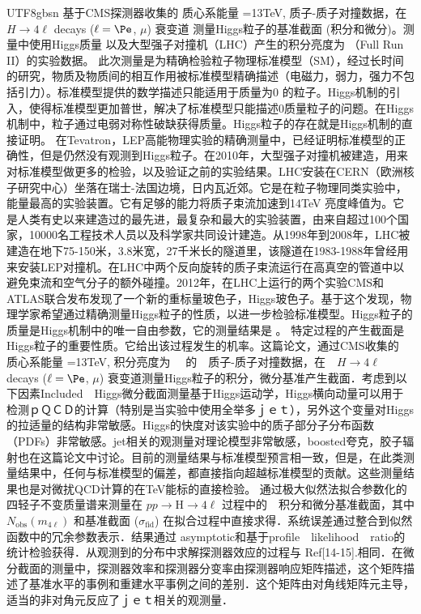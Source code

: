 \begin{CJK}{UTF8}{gbsn}
基于CMS探测器收集的 质心系能量 =13TeV, 质子-质子对撞数据，在$ H \to 4\ell$ decays ($\ell = \Pe$, $\mu$) 衰变道 测量Higgs粒子的基准截面 (积分和微分)。测量中使用Higgs质量 以及大型强子对撞机（LHC）产生的积分亮度为 （Full Run II）的实验数据。
此次测量是为精确检验粒子物理标准模型（SM），经过长时间的研究，物质及物质间的相互作用被标准模型精确描述（电磁力，弱力，强力不包括引力）。标准模型提供的数学描述只能适用于质量为0 的粒子。Higgs机制的引入，使得标准模型更加普世，解决了标准模型只能描述0质量粒子的问题。在Higgs机制中，粒子通过电弱对称性破缺获得质量。Higgs粒子的存在就是Higgs机制的直接证明。
在Tevatron，LEP高能物理实验的精确测量中，已经证明标准模型的正确性，但是仍然没有观测到Higgs粒子。在2010年，大型强子对撞机被建造，用来对标准模型做更多的检验，以及验证之前的实验结果。LHC安装在CERN（欧洲核子研究中心）坐落在瑞士-法国边境，日内瓦近郊。它是在粒子物理同类实验中，能量最高的实验装置。它有足够的能力将质子束流加速到14TeV 亮度峰值为。它是人类有史以来建造过的最先进，最复杂和最大的实验装置，由来自超过100个国家，10000名工程技术人员以及科学家共同设计建造。从1998年到2008年，LHC被建造在地下75-150米，3.8米宽，27千米长的隧道里，该隧道在1983-1988年曾经用来安装LEP对撞机。在LHC中两个反向旋转的质子束流运行在高真空的管道中以避免束流和空气分子的额外碰撞。2012年，在LHC上运行的两个实验CMS和ATLAS联合发布发现了一个新的重标量玻色子，Higgs玻色子。基于这个发现，物理学家希望通过精确测量Higgs粒子的性质，以进一步检验标准模型。Higgs粒子的质量是Higgs机制中的唯一自由参数，它的测量结果是 。
特定过程的产生截面是Higgs粒子的重要性质。它给出该过程发生的机率。这篇论文，通过CMS收集的　质心系能量 =13TeV, 积分亮度为 　的　质子-质子对撞数据，在　$ H \to 4\ell$ decays ($\ell = \Pe$, $\mu$) 衰变道测量Higgs粒子的积分，微分基准产生截面．考虑到以下因素Included　Higgs微分截面测量基于Higgs运动学，Higgs横向动量可以用于检测ｐＱＣＤ的计算（特别是当实验中使用全举多ｊｅｔ），另外这个变量对Higgs的拉适量的结构非常敏感。Higgs的快度对该实验中的质子部分子分布函数（PDFs）非常敏感。jet相关的观测量对理论模型非常敏感，boosted夸克，胶子辐射也在这篇论文中讨论。目前的测量结果与标准模型预言相一致，但是，在此类测量结果中，任何与标准模型的偏差，都直接指向超越标准模型的贡献。这些测量结果也是对微扰QCD计算的在TeV能标的直接检验。
	通过极大似然法拟合参数化的四轻子不变质量谱来测量在 $pp\to$H$\to4\ell$ 过程中的　积分和微分基准截面，其中 $N_{\mathrm{obs}}(m_{4\ell})$ 和基准截面 ($\sigma_{\mathrm{fid}}$) 在拟合过程中直接求得．系统误差通过整合到似然函数中的冗余参数表示．结果通过 asymptotic和基于profile　likelihood　ratio的统计检验获得．从观测到的分布中求解探测器效应的过程与 Ref[14-15].相同．在微分截面的测量中，探测器效率和探测器分变率由探测器响应矩阵描述，这个矩阵描述了基准水平的事例和重建水平事例之间的差别．这个矩阵由对角线矩阵元主导，适当的非对角元反应了ｊｅｔ相关的观测量．

\end{CJK}
